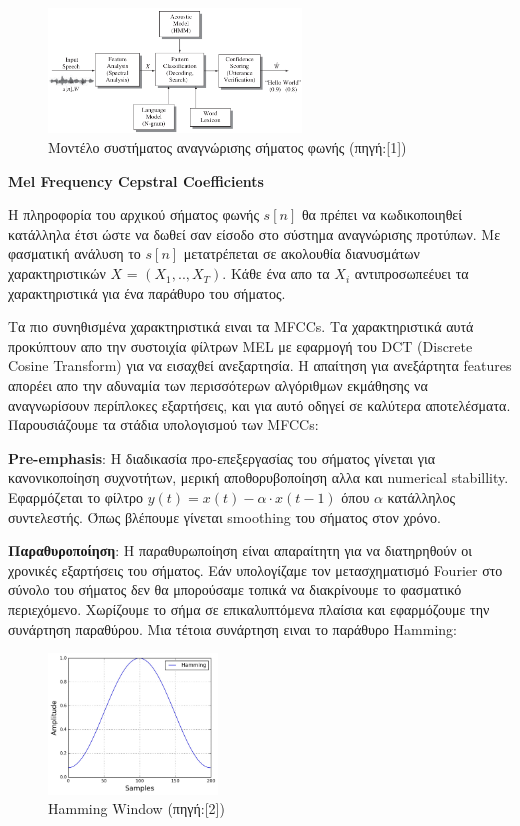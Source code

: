 \documentclass[12pt]{article}
\begin{document}
\begin{figure}[h]
\caption{Μοντέλο συστήματος αναγνώρισης σήματος φωνής (πηγή:[1])}
\centering
\includegraphics[width=0.6\textwidth]{ASR_diagram}
\end{figure}


\textbf{Mel Frequency Cepstral Coefficients}

Η πληροφορία του αρχικού σήματος φωνής $s[n]$ θα πρέπει να κωδικοποιηθεί κατάλληλα έτσι ώστε να δωθεί σαν είσοδο στο σύστημα αναγνώρισης προτύπων. Με φασματική ανάλυση το $s[n]$ μετατρέπεται σε ακολουθία διανυσμάτων χαρακτηριστικών \textbf{$X$} = \textbf{$(X_1,..,X_T)$}. Κάθε ένα απο τα $X_i$ αντιπροσωπεέυει τα χαρακτηριστικά για ένα παράθυρο του σήματος.

Τα πιο συνηθισμένα χαρακτηριστικά ειναι τα MFCCs. Τα χαρακτηριστικά αυτά προκύπτουν απο την συστοιχία φίλτρων MEL με εφαρμογή του DCT (Discrete Cosine Transform) για να εισαχθεί ανεξαρτησία. Η απαίτηση για ανεξάρτητα features απορέει απο την αδυναμία των περισσότερων αλγόριθμων εκμάθησης να αναγνωρίσουν περίπλοκες εξαρτήσεις, και για αυτό οδηγεί σε καλύτερα αποτελέσματα. Παρουσιάζουμε τα στάδια υπολογισμού των MFCCs:

\textbf{Pre-emphasis}: Η διαδικασία προ-επεξεργασίας του σήματος γίνεται για κανονικοποίηση συχνοτήτων, μερική αποθορυβοποίηση αλλα και numerical stabillity. Εφαρμόζεται το φίλτρο $y(t) = x(t) - α\cdot x(t-1)$ όπου $α$ κατάλληλος συντελεστής. Όπως βλέπουμε γίνεται smoothing του σήματος στον χρόνο. 

\textbf{Παραθυροποίηση}:  Η παραθυρωποίηση είναι απαραίτητη για να διατηρηθούν οι χρονικές εξαρτήσεις του σήματος. Εάν υπολογίζαμε τον μετασχηματισμό Fourier στο σύνολο του σήματος δεν θα μπορούσαμε τοπικά να διακρίνουμε το φασματικό περιεχόμενο. Χωρίζουμε το σήμα σε επικαλυπτόμενα πλαίσια και εφαρμόζουμε την συνάρτηση παραθύρου. Μια τέτοια συνάρτηση ειναι το παράθυρο Hamming: 

\begin{figure}[h]
\caption{Hamming Window (πηγή:[2])}
\centering
\includegraphics[width=0.4\textwidth]{hamming_window}
\end{figure}
\end{document}
